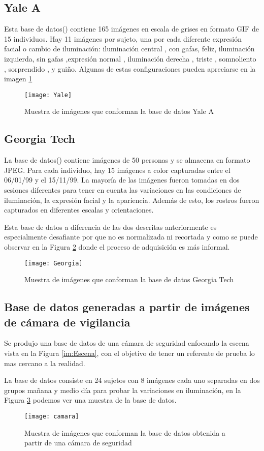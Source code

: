 \subsection{Yale A}
Esta base de datos(\cite{georghiades1997yale}) contiene 165 imágenes en escala de grises en formato GIF de 15 individuos. Hay 11 imágenes por sujeto, una por cada diferente expresión facial o cambio de iluminación: iluminación central , con gafas, feliz, iluminación izquierda, sin gafas ,expresión normal , iluminación derecha , triste , somnoliento , sorprendido , y guiño. Algunas de estas configuraciones pueden apreciarse en la imagen \ref{Yale}
\begin{figure}[h]
	\center
	\texttt{[image: Yale]}
    \caption{Muestra de imágenes que conforman la base de datos Yale A}
    \label{Yale}
\end{figure}
\subsection{Georgia Tech}
La base de datos(\cite{Georgia}) contiene imágenes de 50 personas y se almacena en formato JPEG. Para cada individuo, hay 15 imágenes a color capturadas entre el 06/01/99 y el 15/11/99. La mayoría de las imágenes fueron tomadas en dos sesiones diferentes para tener en cuenta las variaciones en las condiciones de iluminación, la expresión facial y la apariencia. Además de esto, los rostros fueron capturados en diferentes escalas y orientaciones.

Esta base de datos a diferencia de las dos descritas anteriormente es especialmente desafiante por que no es normalizada ni recortada y como se puede observar en la Figura \ref{Georgia} donde el proceso de adquisición es más informal.
\begin{figure}[h]
	\centering
	\texttt{[image: Georgia]}
    \caption{Muestra de imágenes que conforman la base de datos Georgia Tech}
    \label{Georgia}
\end{figure}
\subsection{Base de datos generadas a partir de imágenes de cámara de vigilancia}
\label{scc:BDCamara}
Se produjo una base de datos de una cámara de seguridad enfocando la escena vista en la Figura \ref{im:Escena}, con el objetivo de tener un referente de prueba lo mas cercano a la realidad.

La base de datos consiste en 24 sujetos con 8 imágenes cada uno separadas en dos grupos mañana y medio día para probar la variaciones en iluminación, en la Figura \ref{camara} podemos ver una muestra de la base de datos.
\begin{figure}[h]
	\centering
	\texttt{[image: camara]}
    \caption{Muestra de imágenes que conforman la base de datos obtenida a partir de una cámara de seguridad}
    \label{camara}
\end{figure}

